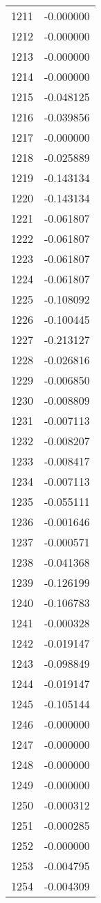 \documentclass[12pt]{article}
\begin{document}
\begin{longtable}{@{}cc@{}}
1211 & -0.000000 \\
1212 & -0.000000 \\
1213 & -0.000000 \\
1214 & -0.000000 \\
1215 & -0.048125 \\
1216 & -0.039856 \\
1217 & -0.000000 \\
1218 & -0.025889 \\
1219 & -0.143134 \\
1220 & -0.143134 \\
1221 & -0.061807 \\
1222 & -0.061807 \\
1223 & -0.061807 \\
1224 & -0.061807 \\
1225 & -0.108092 \\
1226 & -0.100445 \\
1227 & -0.213127 \\
1228 & -0.026816 \\
1229 & -0.006850 \\
1230 & -0.008809 \\
1231 & -0.007113 \\
1232 & -0.008207 \\
1233 & -0.008417 \\
1234 & -0.007113 \\
1235 & -0.055111 \\
1236 & -0.001646 \\
1237 & -0.000571 \\
1238 & -0.041368 \\
1239 & -0.126199 \\
1240 & -0.106783 \\
1241 & -0.000328 \\
1242 & -0.019147 \\
1243 & -0.098849 \\
1244 & -0.019147 \\
1245 & -0.105144 \\
1246 & -0.000000 \\
1247 & -0.000000 \\
1248 & -0.000000 \\
1249 & -0.000000 \\
1250 & -0.000312 \\
1251 & -0.000285 \\
1252 & -0.000000 \\
1253 & -0.004795 \\
1254 & -0.004309 \\

\end{longtable}
\end{document}
